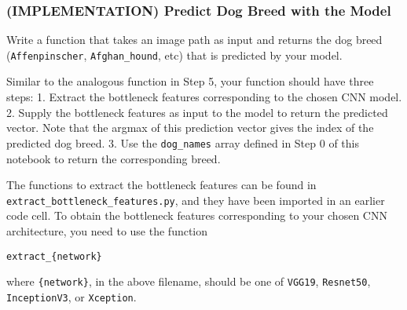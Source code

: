 \documentclass[11pt]{article}
\begin{document}
    \hypertarget{implementation-predict-dog-breed-with-the-model}{%
\subsubsection{(IMPLEMENTATION) Predict Dog Breed with the
Model}\label{implementation-predict-dog-breed-with-the-model}}

Write a function that takes an image path as input and returns the dog
breed (\texttt{Affenpinscher}, \texttt{Afghan\_hound}, etc) that is
predicted by your model.

Similar to the analogous function in Step 5, your function should have
three steps: 1. Extract the bottleneck features corresponding to the
chosen CNN model. 2. Supply the bottleneck features as input to the
model to return the predicted vector. Note that the argmax of this
prediction vector gives the index of the predicted dog breed. 3. Use the
\texttt{dog\_names} array defined in Step 0 of this notebook to return
the corresponding breed.

The functions to extract the bottleneck features can be found in
\texttt{extract\_bottleneck\_features.py}, and they have been imported
in an earlier code cell. To obtain the bottleneck features corresponding
to your chosen CNN architecture, you need to use the function

\begin{verbatim}
extract_{network}
\end{verbatim}

where \texttt{\{network\}}, in the above filename, should be one of
\texttt{VGG19}, \texttt{Resnet50}, \texttt{InceptionV3}, or
\texttt{Xception}.
\end{document}
